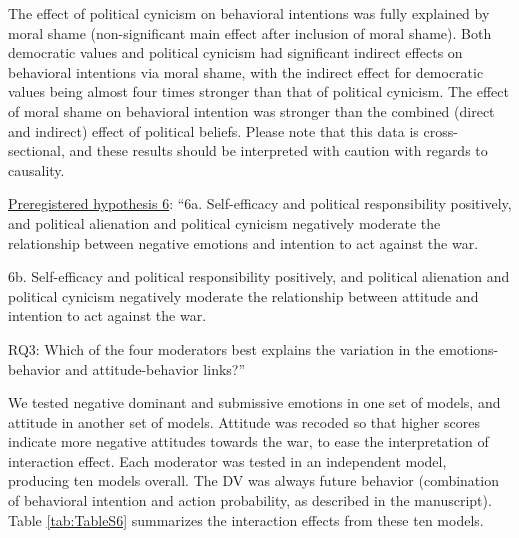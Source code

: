 \documentclass[
]{article}
\begin{document}
The effect of political cynicism on behavioral intentions was fully explained by moral shame (non-significant main effect after inclusion of moral shame). Both democratic values and political cynicism had significant indirect effects on behavioral intentions via moral shame, with the indirect effect for democratic values being almost four times stronger than that of political cynicism. The effect of moral shame on behavioral intention was stronger than the combined (direct and indirect) effect of political beliefs. Please note that this data is cross-sectional, and these results should be interpreted with caution with regards to causality.

\ul{Preregistered hypothesis 6}: ``6a. Self-efficacy and political responsibility positively, and political alienation and political cynicism negatively moderate the relationship between negative emotions and intention to act against the war.

6b. Self-efficacy and political responsibility positively, and political alienation and political cynicism negatively moderate the relationship between attitude and intention to act against the war.

RQ3: Which of the four moderators best explains the variation in the emotions-behavior and attitude-behavior links?''

We tested negative dominant and submissive emotions in one set of models, and attitude in another set of models. Attitude was recoded so that higher scores indicate more negative attitudes towards the war, to ease the interpretation of interaction effect. Each moderator was tested in an independent model, producing ten models overall. The DV was always future behavior (combination of behavioral intention and action probability, as described in the manuscript). Table \ref{tab:TableS6} summarizes the interaction effects from these ten models.
\end{document}
